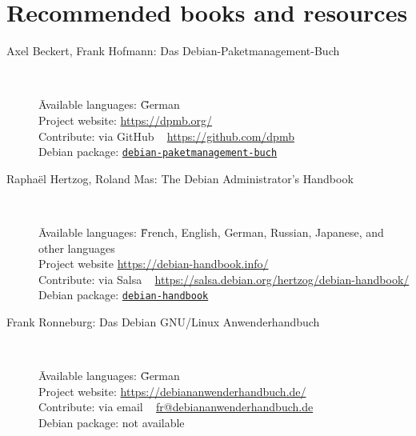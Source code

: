 \documentclass[10pt]{article}
\begin{document}
\newpage

\cheatsheet

\section{Recommended books and resources}

\begin{description}
    \item[Axel Beckert, Frank Hofmann: Das Debian-Paketmanagement-Buch] ~ \\
        \begin{tabbing}
            \= Available languages: \= \= German \\
            \> Project website: \> \> \href{https://dpmb.org/}{https://dpmb.org/} \\
            \> Contribute: \> \> via GitHub ~  \href{https://github.com/dpmb}{https://github.com/dpmb} \\
            \> Debian package: \> \> \href{https://packages.debian.org/stable/debian-paketmanagement-buch}{\texttt{debian-paketmanagement-buch}} \\ 
        \end{tabbing}

    \item[Raphaël Hertzog, Roland Mas: The Debian Administrator's Handbook] ~ \\ 
        \begin{tabbing}
            \= Available languages: \= \= French, English, German, Russian, Japanese, and other languages \\
            \> Project website \> \> \href{https://debian-handbook.info/}{https://debian-handbook.info/} \\
            \> Contribute: \> \> via Salsa ~ \href{https://salsa.debian.org/hertzog/debian-handbook/}{https://salsa.debian.org/hertzog/debian-handbook/} \\
            \> Debian package: \> \> \href{https://packages.debian.org/stable/debian-handbook}{\texttt{debian-handbook}} \\
        \end{tabbing}

    \item[Frank Ronneburg: Das Debian GNU/Linux Anwenderhandbuch] ~ \\
        \begin{tabbing}
            \= Available languages: \= \= German \\
            \> Project website: \> \> \href{https://debiananwenderhandbuch.de/}{https://debiananwenderhandbuch.de/} \\
            \> Contribute: \> \> via email ~  
            \href{mailto:fr@debiananwenderhandbuch.de}{fr@debiananwenderhandbuch.de} \\
            
            \> Debian package: \> \> not available
        \end{tabbing}
    \end{description}
\end{document}
